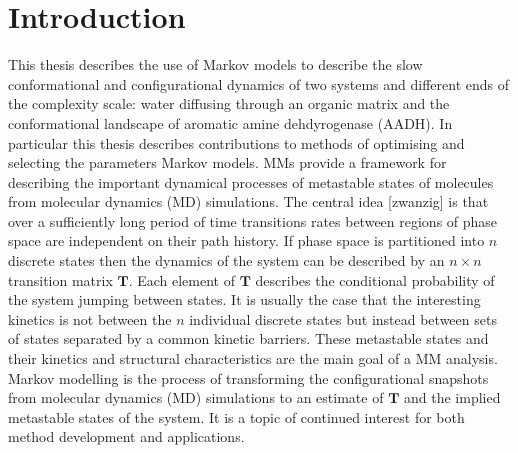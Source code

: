 %
%
\let\textcircled=\pgftextcircled
\chapter{Introduction}
\label{chap:intro}

This thesis describes the use of Markov models to describe the slow conformational and configurational dynamics of two systems and different ends of the complexity scale: water diffusing through an organic matrix and the conformational landscape of aromatic amine dehdyrogenase (AADH). In particular this thesis describes contributions to methods of optimising and selecting the parameters Markov models. MMs provide a framework for describing the important dynamical processes of metastable states of molecules from molecular dynamics (MD) simulations. The central idea [zwanzig] is that over a sufficiently long period of time transitions rates between regions of phase space are independent on their path history. If phase space is partitioned into $n$ discrete states then the dynamics of the system can be described by an $n\times n$ transition matrix $\mathbf{T}$. Each element of $\mathbf{T}$ describes the conditional probability of the system jumping between states. It is usually the case that the interesting kinetics is not between the $n$ individual discrete states but instead between sets of states separated by a common kinetic barriers. These metastable states and their kinetics and structural characteristics are the main goal of a MM analysis. Markov modelling is the process of transforming the configurational snapshots from molecular dynamics (MD) simulations to an estimate of $\mathbf{T}$ and the implied metastable states of the system.  It is a  topic of continued interest \cite{husicMarkovStateModels2018}\cite{noeMarkovModelsMolecular2019b}\cite{wangConstructingMarkovState2018c} for both method development and applications.  

